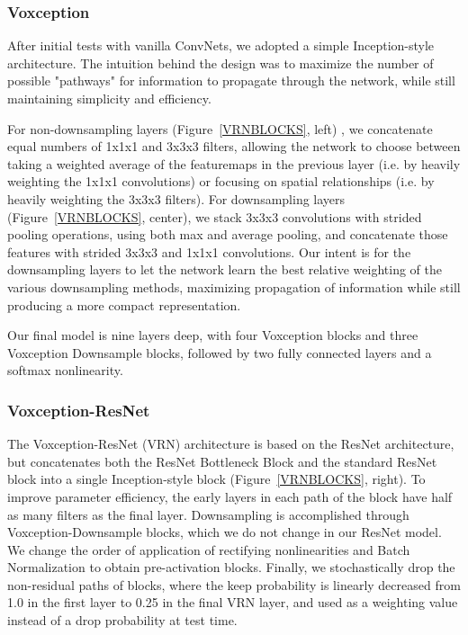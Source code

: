 \documentclass{article}
\begin{document}
\subsubsection{Voxception}
After initial tests with vanilla ConvNets, we adopted a simple Inception-style architecture. The intuition behind the design was to maximize the number of possible "pathways" for information to propagate through the network, while still maintaining simplicity and efficiency. 

For non-downsampling layers (Figure~\ref{VRNBLOCKS}, left) , we concatenate equal numbers of 1x1x1 and 3x3x3 filters, allowing the network to choose between taking a weighted average of the featuremaps in the previous layer (i.e. by heavily weighting the 1x1x1 convolutions) or focusing on spatial relationships (i.e. by heavily weighting the 3x3x3 filters). For downsampling layers (Figure~\ref{VRNBLOCKS}, center), we stack 3x3x3 convolutions with strided pooling operations, using both max and average pooling, and concatenate those features with strided 3x3x3 and 1x1x1 convolutions. Our intent is for the downsampling layers to let the network learn the best relative weighting of the various downsampling methods, maximizing propagation of information while still producing a more compact representation.

Our final model is nine layers deep, with four Voxception blocks and three Voxception Downsample blocks, followed by two fully connected layers and a softmax nonlinearity. 

\subsubsection{Voxception-ResNet}
The Voxception-ResNet (VRN) architecture is based on the ResNet architecture\citep{ResNet}, but concatenates both the ResNet Bottleneck Block and the standard ResNet block into a single Inception\citep{Inception}-style block (Figure~\ref{VRNBLOCKS}, right). To improve parameter efficiency, the early layers in each path of the block have half as many filters as the final layer. Downsampling is accomplished through Voxception-Downsample blocks, which we do not change in our ResNet model. We change the order of application of rectifying nonlinearities and Batch Normalization to obtain pre-activation blocks\citep{PreActivation}. Finally, we stochastically drop the non-residual paths of blocks\citep{StochasticDepth}, where the keep probability is linearly decreased from 1.0 in the first layer to 0.25 in the final VRN layer, and used as a weighting value instead of a drop probability at test time.
\end{document}
